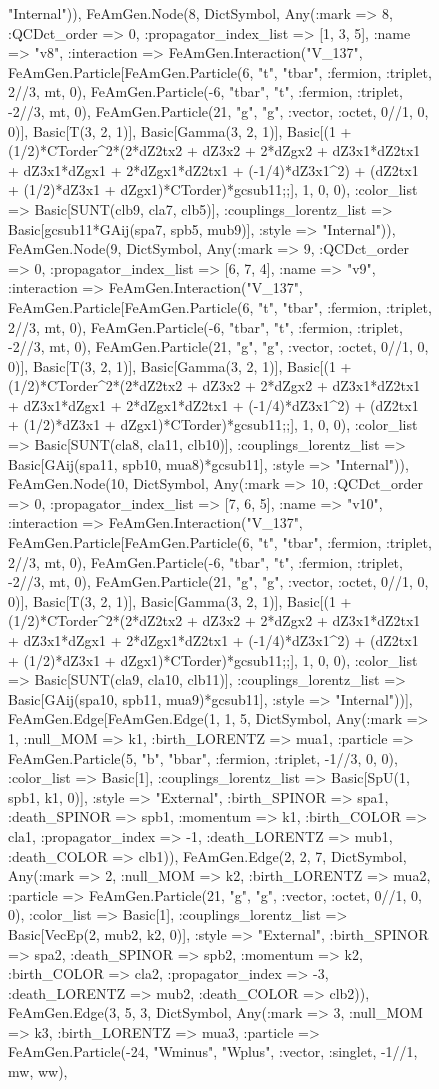 \documentclass{revtex4}
\begin{document}
\begin{figure}[!htb]
\begin{center}
{"Internal")), FeAmGen.Node(8, Dict{Symbol, Any}(:mark => 8, :QCDct_order => 0, :propagator_index_list => [1, 3, 5], :name => "v8", :interaction => FeAmGen.Interaction("V_137", FeAmGen.Particle[FeAmGen.Particle(6, "t", "tbar", :fermion, :triplet, 2//3, mt, 0), FeAmGen.Particle(-6, "tbar", "t", :fermion, :triplet, -2//3, mt, 0), FeAmGen.Particle(21, "g", "g", :vector, :octet, 0//1, 0, 0)], Basic[T(3, 2, 1)], Basic[Gamma(3, 2, 1)], Basic[(1 + (1/2)*CTorder^2*(2*dZ2tx2 + dZ3x2 + 2*dZgx2 + dZ3x1*dZ2tx1 + dZ3x1*dZgx1 + 2*dZgx1*dZ2tx1 + (-1/4)*dZ3x1^2) + (dZ2tx1 + (1/2)*dZ3x1 + dZgx1)*CTorder)*gcsub11;;], 1, 0, 0), :color_list => Basic[SUNT(clb9, cla7, clb5)], :couplings_lorentz_list => Basic[gcsub11*GAij(spa7, spb5, mub9)], :style => "Internal")), FeAmGen.Node(9, Dict{Symbol, Any}(:mark => 9, :QCDct_order => 0, :propagator_index_list => [6, 7, 4], :name => "v9", :interaction => FeAmGen.Interaction("V_137", FeAmGen.Particle[FeAmGen.Particle(6, "t", "tbar", :fermion, :triplet, 2//3, mt, 0), FeAmGen.Particle(-6, "tbar", "t", :fermion, :triplet, -2//3, mt, 0), FeAmGen.Particle(21, "g", "g", :vector, :octet, 0//1, 0, 0)], Basic[T(3, 2, 1)], Basic[Gamma(3, 2, 1)], Basic[(1 + (1/2)*CTorder^2*(2*dZ2tx2 + dZ3x2 + 2*dZgx2 + dZ3x1*dZ2tx1 + dZ3x1*dZgx1 + 2*dZgx1*dZ2tx1 + (-1/4)*dZ3x1^2) + (dZ2tx1 + (1/2)*dZ3x1 + dZgx1)*CTorder)*gcsub11;;], 1, 0, 0), :color_list => Basic[SUNT(cla8, cla11, clb10)], :couplings_lorentz_list => Basic[GAij(spa11, spb10, mua8)*gcsub11], :style => "Internal")), FeAmGen.Node(10, Dict{Symbol, Any}(:mark => 10, :QCDct_order => 0, :propagator_index_list => [7, 6, 5], :name => "v10", :interaction => FeAmGen.Interaction("V_137", FeAmGen.Particle[FeAmGen.Particle(6, "t", "tbar", :fermion, :triplet, 2//3, mt, 0), FeAmGen.Particle(-6, "tbar", "t", :fermion, :triplet, -2//3, mt, 0), FeAmGen.Particle(21, "g", "g", :vector, :octet, 0//1, 0, 0)], Basic[T(3, 2, 1)], Basic[Gamma(3, 2, 1)], Basic[(1 + (1/2)*CTorder^2*(2*dZ2tx2 + dZ3x2 + 2*dZgx2 + dZ3x1*dZ2tx1 + dZ3x1*dZgx1 + 2*dZgx1*dZ2tx1 + (-1/4)*dZ3x1^2) + (dZ2tx1 + (1/2)*dZ3x1 + dZgx1)*CTorder)*gcsub11;;], 1, 0, 0), :color_list => Basic[SUNT(cla9, cla10, clb11)], :couplings_lorentz_list => Basic[GAij(spa10, spb11, mua9)*gcsub11], :style => "Internal"))], FeAmGen.Edge[FeAmGen.Edge(1, 1, 5, Dict{Symbol, Any}(:mark => 1, :null_MOM => k1, :birth_LORENTZ => mua1, :particle => FeAmGen.Particle(5, "b", "bbar", :fermion, :triplet, -1//3, 0, 0), :color_list => Basic[1], :couplings_lorentz_list => Basic[SpU(1, spb1, k1, 0)], :style => "External", :birth_SPINOR => spa1, :death_SPINOR => spb1, :momentum => k1, :birth_COLOR => cla1, :propagator_index => -1, :death_LORENTZ => mub1, :death_COLOR => clb1)), FeAmGen.Edge(2, 2, 7, Dict{Symbol, Any}(:mark => 2, :null_MOM => k2, :birth_LORENTZ => mua2, :particle => FeAmGen.Particle(21, "g", "g", :vector, :octet, 0//1, 0, 0), :color_list => Basic[1], :couplings_lorentz_list => Basic[VecEp(2, mub2, k2, 0)], :style => "External", :birth_SPINOR => spa2, :death_SPINOR => spb2, :momentum => k2, :birth_COLOR => cla2, :propagator_index => -3, :death_LORENTZ => mub2, :death_COLOR => clb2)), FeAmGen.Edge(3, 5, 3, Dict{Symbol, Any}(:mark => 3, :null_MOM => k3, :birth_LORENTZ => mua3, :particle => FeAmGen.Particle(-24, "Wminus", "Wplus", :vector, :singlet, -1//1, mw, ww), }
\end{center}
\end{figure}
\end{document}
